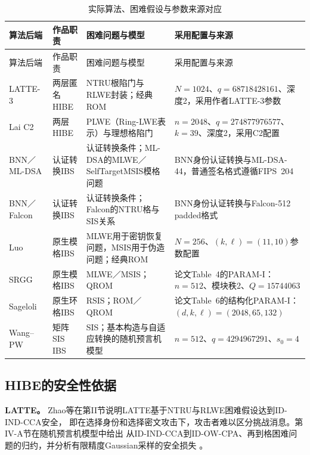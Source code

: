 \begin{longtable}{@{}>{\raggedright\arraybackslash}p{}>{\raggedright\arraybackslash}p{}>{\raggedright\arraybackslash}p{}>{\raggedright\arraybackslash}p{}@{}}
\caption{实际算法、困难假设与参数来源对应}\label{tab:assumption-source-map}\\
\toprule
\rowcolor{black!8} 算法后端 & 作品职责 & 困难问题与模型 & 采用配置与来源 \\
\midrule
\endfirsthead
\toprule
\rowcolor{black!8} 算法后端 & 作品职责 & 困难问题与模型 & 采用配置与来源 \\
\midrule
\endhead
LATTE-3 & 两层匿名HIBE & NTRU根陷门与RLWE封装；经典ROM & $N=1024$、$q=68718428161$、深度2，采用作者LATTE-3参数\cite{zhao2024latte} \\
Lai C2 & 两层HIBE & PLWE（Ring-LWE表示）与理想格陷门 & $n=2048$、$q=274877976577$、$k=39$、深度2，采用C2配置\cite{lai2015trapdoors} \\
BNN／ML-DSA & 认证转换IBS & 认证转换条件；ML-DSA的MLWE／SelfTargetMSIS模格问题 & BNN身份认证转换与ML-DSA-44，普通签名格式遵循FIPS~204\cite{galindo2006ibs,nist2024fips204} \\
BNN／Falcon & 认证转换IBS & 认证转换条件；Falcon的NTRU格与SIS关系 & BNN身份认证转换与Falcon-512 padded格式\cite{galindo2006ibs,falcon2020} \\
Luo & 原生模格IBS & MLWE用于密钥恢复问题，MSIS用于伪造问题；经典ROM & $N=256$、$(k,\ell)=(11,10)$参数配置\cite{luo2024ibs} \\
SRGG & 原生模格IBS & MLWE／MSIS；QROM & 论文Table~4的PARAM-I：$n=512$、模块秩2、$Q=15744063$\cite{jia2025ibs} \\
Sageloli & 原生环格IBS & RSIS；ROM／QROM & 论文Table~6的结构化PARAM-I：$(d,k,\ell)=(2048,65,132)$\cite{sageloli2023ibs} \\
Wang--PW & 矩阵SIS IBS & SIS；基本构造与自适应转换的随机预言机模型 & $n=512$、$q=4294967291$、$s_0=4$\cite{wang2024ibme,pan2021ibs} \\
\bottomrule
\end{longtable}

\subsection{HIBE的安全性依据}
\textbf{LATTE。} Zhao等在第II节说明LATTE基于NTRU与RLWE困难假设达到ID-IND-CCA安全，
即在选择身份和选择密文攻击下，攻击者难以区分挑战消息。第IV-A节在随机预言机模型中给出
从ID-IND-CCA到ID-OW-CPA、再到格困难问题的归约，并分析有限精度Gaussian采样的安全损失
\cite{zhao2024latte}。

